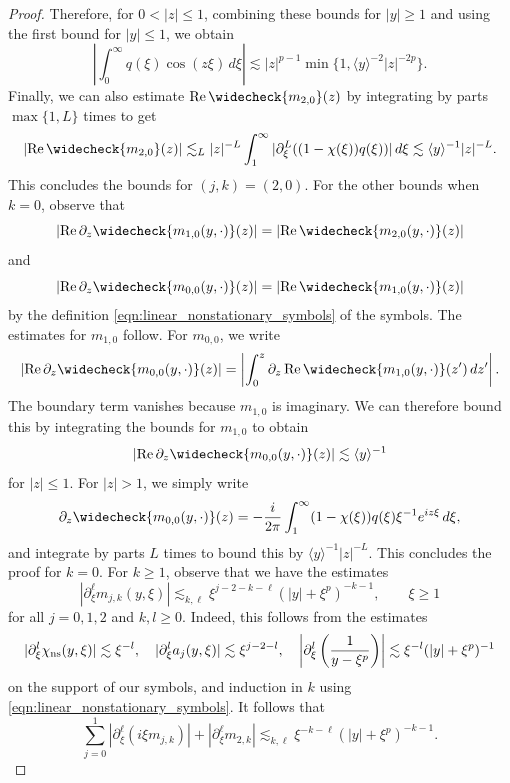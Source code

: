 \documentclass[11pt]{amsart}
\theoremstyle{definition}
\theoremstyle{remark}
\numberwithin{equation}{section}
\newcommand{\ang}[1]{\langle #1 \rangle}
\begin{document}
\begin{proof}
    Therefore, for $0<|z|\leq1$, combining these bounds for $|y|\geq1$ and using the first bound for $|y|\leq1$, we obtain
    \[\left|\int_{0}^{\infty} q(\xi) \cos(z\xi) \, d\xi\right| \lesssim |z|^{p-1}\min\{1, \ang{y}^{-2}|z|^{-2p}\}.\]
    Finally, we can also estimate $\text{Re} \, \widecheck{m_{2,0}}(z)$ by integrating by parts $\max\{1, L\}$ times to get
    \[|\text{Re} \, \widecheck{m_{2,0}}(z)| \lesssim_L |z|^{-L} \int_{1}^\infty |\partial^L_\xi((1 - \chi(\xi))q(\xi))| \, d\xi \lesssim \ang{y}^{-1}|z|^{-L}.\]
    This concludes the bounds for $(j, k) = (2, 0)$. For the other bounds when $k = 0$, observe that
    \[\left|\operatorname{Re}\partial_z\widecheck{m_{1,0}(y,\cdot)}(z)\right| = \left|\operatorname{Re}\widecheck{m_{2,0}(y,\cdot)}(z)\right|\]
    and 
    \[\left|\operatorname{Re}\partial_z\widecheck{m_{0,0}(y,\cdot)}(z)\right| = \left|\operatorname{Re}\widecheck{m_{1,0}(y,\cdot)}(z)\right|
        \]
    by the definition \eqref{eqn:linear_nonstationary_symbols} of the symbols. The estimates for $m_{1,0}$ follow. For $m_{0,0}$, we write
    \[\left|\operatorname{Re}\partial_z\widecheck{m_{0,0}(y,\cdot)}(z)\right| = \left|\int_{0}^{z}\partial_z\operatorname{Re}\widecheck{m_{1,0}(y,\cdot)}(z') \, dz'\right|.\]
    The boundary term vanishes because $m_{1,0}$ is imaginary. We can therefore bound this by integrating the bounds for $m_{1,0}$ to obtain 
    \[\left|\operatorname{Re}\partial_z\widecheck{m_{0,0}(y,\cdot)}(z)\right| \lesssim \ang{y}^{-1}\]
    for $|z| \leq 1$. For $|z| > 1$, we simply write
    \[\partial_z \widecheck{m_{0,0}(y,\cdot)}(z) = -\frac{i}{2\pi}\int_{1}^{\infty}(1 - \chi(\xi))q(\xi)\xi^{-1} e^{iz\xi} \, d\xi,\]
    and integrate by parts $L$ times to bound this by $\ang{y}^{-1}|z|^{-L}$. This concludes the proof for $k = 0$. For $k \geq 1$, observe that we have the estimates
    \[
    |\partial_\xi^\ell m_{j,k}(y,\xi)|
    \lesssim_{k,\ell}
    \xi^{j-2-k-\ell}(|y|+\xi^p)^{-k-1},
    \qquad \xi\ge1
    \]
    for all $j = 0,1,2$ and $k,l \geq 0$. Indeed, this follows from the estimates
    \[|\partial_\xi^{l} \chi_{\textup{ns}}(y, \xi)| \lesssim \xi^{-l}, \quad  |\partial_\xi^{l} a_j(y, \xi)| \lesssim \xi^{j - 2 - l}, \quad \left|\partial_\xi^l \left(\frac{1}{y - \xi^p}\right)\right| \lesssim \xi^{-l}(|y| + \xi^p)^{-1}\]
    on the support of our symbols, and induction in $k$ using \eqref{eqn:linear_nonstationary_symbols}. It follows that
    \[
        \sum_{j=0}^{1}
        |\partial_\xi^\ell(i\xi m_{j,k})|
        +
        |\partial_\xi^\ell m_{2,k}|
        \lesssim_{k,\ell}
        \xi^{-k-\ell}(|y|+\xi^p)^{-k-1}.
\]
\end{proof}
\end{document}
